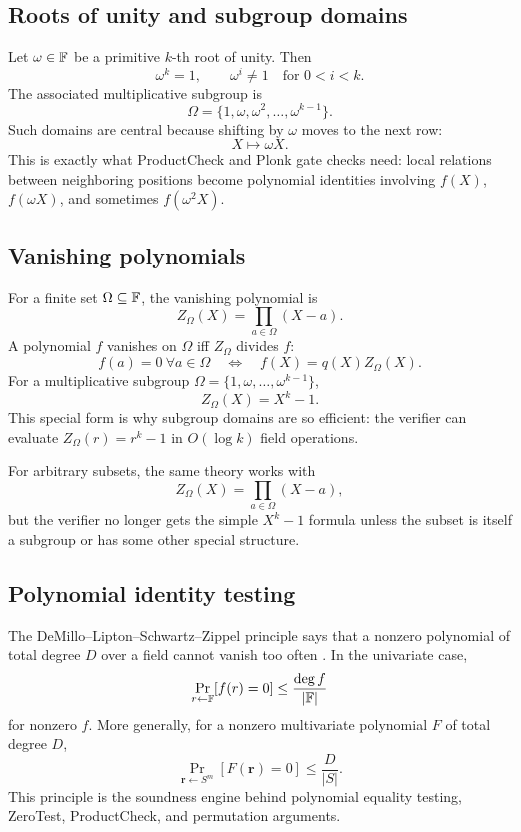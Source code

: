 \subsection{Roots of unity and subgroup domains}

Let $\omega\in\mathbb{F}$ be a primitive $k$-th root of unity. Then
\[
    \omega^k=1,
    \qquad
    \omega^i\neq 1\quad\text{for }0<i<k.
\]
The associated multiplicative subgroup is
\[
    \Omega=\{1,\omega,\omega^2,\ldots,\omega^{k-1}\}.
\]
Such domains are central because shifting by $\omega$ moves to the next row:
\[
    X\mapsto \omega X.
\]
This is exactly what ProductCheck and Plonk gate checks need: local relations between neighboring positions become polynomial identities involving $f(X)$, $f(\omega X)$, and sometimes $f(\omega^2X)$.

\subsection{Vanishing polynomials}

For a finite set $\Omega\subseteq\mathbb{F}$, the vanishing polynomial is
\[
    Z_\Omega(X)=\prod_{a\in\Omega}(X-a).
\]
A polynomial $f$ vanishes on $\Omega$ iff $Z_\Omega$ divides $f$:
\[
    f(a)=0\ \forall a\in\Omega
    \quad\Longleftrightarrow\quad
    f(X)=q(X)Z_\Omega(X).
\]
For a multiplicative subgroup $\Omega=\{1,\omega,\ldots,\omega^{k-1}\}$,
\[
    Z_\Omega(X)=X^k-1.
\]
This special form is why subgroup domains are so efficient: the verifier can evaluate $Z_\Omega(r)=r^k-1$ in $O(\log k)$ field operations.

For arbitrary subsets, the same theory works with
\[
    Z_\Omega(X)=\prod_{a\in\Omega}(X-a),
\]
but the verifier no longer gets the simple $X^k-1$ formula unless the subset is itself a subgroup or has some other special structure.

\subsection{Polynomial identity testing}

The DeMillo--Lipton--Schwartz--Zippel principle says that a nonzero polynomial of total degree $D$ over a field cannot vanish too often \cite{DeMilloLipton1978,Schwartz1980,Zippel1979}. In the univariate case,
\[
    \Pr_{r\leftarrow \mathbb{F}}[f(r)=0]\le \frac{\deg f}{|\mathbb{F}|}
\]
for nonzero $f$. More generally, for a nonzero multivariate polynomial $F$ of total degree $D$,
\[
    \Pr_{\mathbf r\leftarrow S^m}[F(\mathbf r)=0]\le \frac{D}{|S|}.
\]
This principle is the soundness engine behind polynomial equality testing, ZeroTest, ProductCheck, and permutation arguments.


